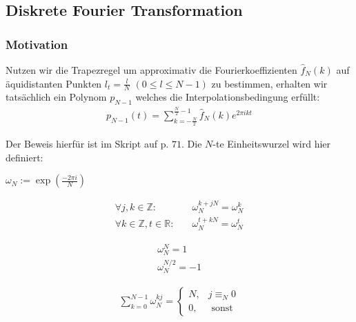 \newsection
\subsection{Diskrete Fourier Transformation}



\subsubsection{Motivation}

Nutzen wir die Trapezregel um approximativ die Fourierkoeffizienten $\hat{f}_N(k)$ auf äquidistanten Punkten $l_t=\frac{l}{N}$ $(0 \leq l \leq N-1)$ zu bestimmen, erhalten wir tatsächlich ein Polynom $p_{N-1}$ welches die Interpolationsbedingung erfüllt:
\begin{align*}
    p_{N-1}(t) = \sum_{k=-\frac{N}{2}}^{\frac{N}{2}-1} \hat{f}_N(k)e^{2\pi ikt}
\end{align*}

Der Beweis hierfür ist im Skript auf p. $71$. Die $N$-te Einheitswurzel wird hier definiert:

 $\omega_N := \exp(\frac{-2\pi i}{N})$

\vspace{-1.5pc}
\begin{multicols}{3}
\begin{align*}
    \forall j,k \in \mathbb{Z}:\quad                 & \omega_N^{k+jN}=\omega_N^k \\
    \forall k \in \mathbb{Z}, t \in \mathbb{R}:\quad & \omega_N^{t+kN}=\omega_N^t 
\end{align*}

\newcolumn
\begin{align*}
    \omega_N^N=1 \\
    \omega_N^{N/2}=-1
\end{align*}

\newcolumn
\begin{align*}
    \sum_{k=0}^{N-1} \omega_N^{kj} = \begin{cases}
        N, & j \equiv_N 0 \\
        0, & \text{ sonst}
    \end{cases}
\end{align*}
\newcolumn
\end{multicols}
\vspace{-1.5pc}
